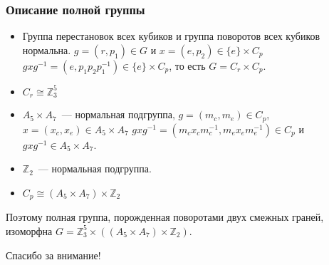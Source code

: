 \documentclass[utf8,russian]{beamer}
\begin{document}
\begin{frame}
\frametitle{Описание полной группы}
\begin{itemize}
	\item Группа перестановок всех кубиков и группа поворотов всех кубиков нормальна. $g=(r,p_1)\in G$ и $x=(e,p_2)\in \{e\}\times C_p$ $gxg^{-1}=(e,p_1p_2p_1^{-1})\in \{e\}\times C_p$, то есть $G=C_r\times C_p$.
	\item $C_r\cong \mathbb{Z}_3^5$
    \item $A_5\times A_7$~--- нормальная подгруппа, $g=(m_c,m_e)\in C_p$, $x=(x_c,x_e)\in A_5\times A_7$ $gxg^{-1}=(m_cx_cm_c^{-1},m_ex_em_e^{-1})\in C_p$ и $gxg^{-1}\in A_5\times A_7$.
    \item $\mathbb{Z}_2$~--- нормальная подгруппа.
    \item $C_p\cong (A_5\times A_7)\times \mathbb{Z}_2$
\end{itemize}
Поэтому полная группа, порожденная поворотами двух смежных граней, изоморфна $G=\mathbb{Z}_3^5\times ((A_5\times A_7)\times\mathbb{Z}_2)$.
\end{frame}


\begin{frame}
\Huge{\centerline{Спасибо за внимание!}}
\end{frame}

\end{document}
